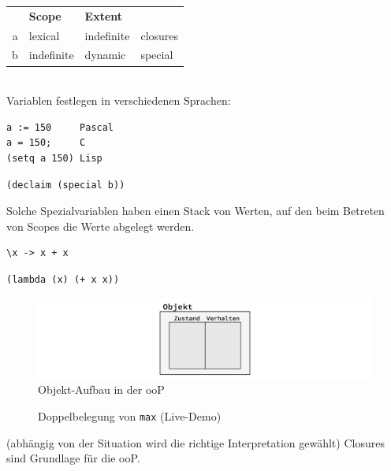 		\begin{tabular}{rlll}
			& \textbf{Scope}	& \textbf{Extent} &  \\
		a	& lexical		& indefinite	& closures \\
		b	& indefinite	& dynamic		& special \\
		\end{tabular}$\;$\\

		Variablen festlegen in verschiedenen Sprachen:
		\begin{verbatim}
a := 150     Pascal
a = 150;     C
(setq a 150) Lisp
		\end{verbatim}

		\lstLisp[Spezialvariablen]
		\begin{lstlisting}
(declaim (special b))
		\end{lstlisting}

		Solche Spezialvariablen haben einen Stack von Werten, auf den beim Betreten von Scopes die Werte abgelegt werden.

	\begin{lstlisting}
\x -> x + x
		\end{lstlisting}

		\begin{lstlisting}
(lambda (x) (+ x x))
		\end{lstlisting}

		\begin{figure}[H]
			\caption{Objekt-Aufbau in der ooP}
			\includegraphics[width=\textwidth]{workfiles/v11_2}
		\end{figure}

		\begin{figure}[H]
			\centering
			\caption{Doppelbelegung von \texttt{max} (Live-Demo)}
		\end{figure}
		(abhängig von der Situation wird die richtige Interpretation gewählt)
		Closures sind Grundlage für die ooP.
		
